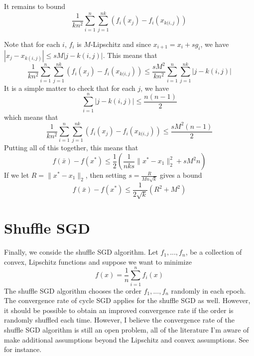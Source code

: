 It remains to bound 
$$\frac{1}{kn^2}\displaystyle\sum_{i = 1}^{n} \displaystyle\sum_{j = 1}^{nk} (f_i(x_j) - f_i(x_{k(i,j}))
$$

Note that for each $i$, $f_i$ is $M$-Lipschitz and since $x_{i+1} = x_{i} + sg_i$, we have $|x_j - x_{k(i,j)}|\leq sM|j - k(i,j)|$.
This means that
\begin{equation}
 \frac{1}{kn^2}\displaystyle\sum_{i = 1}^{n} \displaystyle\sum_{j = 1}^{nk} (f_i(x_j) - f_i(x_{k(i,j})) \leq \frac{sM^2}{kn^2}\displaystyle\sum_{i = 1}^{n} \displaystyle\sum_{j = 1}^{nk} |j - k(i,j)|
\end{equation}
It is a simple matter to check that for each $j$, we have
\begin{equation}
 \displaystyle\sum_{i = 1}^{n}|j - k(i,j)| \leq \frac{n(n-1)}{2}
\end{equation}
which means that
\begin{equation}
 \frac{1}{kn^2}\displaystyle\sum_{i = 1}^{n} \displaystyle\sum_{j = 1}^{nk} (f_i(x_j) - f_i(x_{k(i,j})) \leq \frac{sM^2(n-1)}{2}
\end{equation}
Putting all of this together, this means that
\begin{equation}
 f(\bar{x}) - f(x^*) \leq \frac{1}{2}\left(\frac{1}{nks} \|x^* - x_1\|_2^2 + sM^2n\right)
\end{equation}
If we let $R = \|x^* - x_1\|_2$, then setting $s = \frac{R}{Mn\sqrt{k}}$ gives a bound
\begin{equation}
 f(\bar{x}) - f(x^*) \leq \frac{1}{2\sqrt{k}}\left(R^2 + M^2\right)
\end{equation}

\section{Shuffle SGD}
Finally, we conside the shuffle SGD algorithm. Let $f_1,...,f_n$, be a collection of convex, Lipschitz functions and suppose we want
to minimize
\begin{equation}
 f(x) = \frac{1}{n}\displaystyle\sum_{i = 1}^n f_i(x)
\end{equation}
The shuffle SGD algorithm chooses the order $f_1,...,f_n$ randomly in each epoch. The convergence rate of cycle SGD 
applies for the shuffle SGD as well. However, it should be possible to obtain an improved convergence
rate if the order is randomly shuffled each time. However, I believe the convergence rate of the shuffle SGD
algorithm is still an open problem, all of the literature I'm aware of make additional assumptions beyond
the Lipschitz and convex assumptions. See \cite{shamir2016without} for instance.

